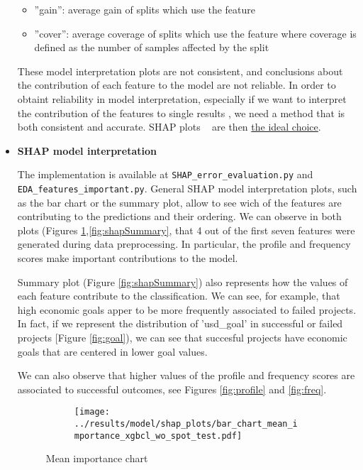 \documentclass{article}
\begin{document}
\begin{itemize}
\begin{itemize}
\item ”gain”: average gain of splits which use the feature

\item ”cover”: average coverage of splits which use the feature where coverage is defined as the number of samples affected by the split
\end{itemize}

These model interpretation plots are not consistent, and conclusions about the contribution of each feature to the model are not reliable. In order to obtaint reliability in model interpretation, especially if we want to interpret the contribution of the features to single results , we need a method that is both consistent and accurate. SHAP plots ~\cite{DBLP:journals/corr/LundbergL17, lundberg2020local2global} are then \href{https://towardsdatascience.com/interpretable-machine-learning-with-xgboost-9ec80d148d27}{the ideal choice}.

\item \textbf{SHAP model interpretation}

The implementation is available at {\tt SHAP\_error\_evaluation.py} and {\tt EDA\_features\_important.py}.
General SHAP model interpretation plots, such as the bar chart or the summary plot, allow to see wich of the features are contributing to the predictions and their ordering. We can observe in both plots (Figures \ref{fig:shapBar},\ref{fig:shapSummary}, that 4 out of the first seven features were generated during data preprocessing. In particular, the profile and frequency scores make important contributions to the model.

Summary plot (Figure \ref{fig:shapSummary}) also represents how the values of each feature contribute to the classification. We can see, for example, that high economic goals apper to be more frequently associated to failed projects. In fact, if we represent the distribution of 'usd\_goal' in successful or failed projects [Figure \ref{fig:goal}), we can see that succesful projects have economic goals that are centered in lower goal values.

We can also observe that higher values of the profile and frequency scores are associated to successful outcomes, see Figures \ref{fig:profile} and \ref{fig:freq}.

\begin{figure}
  \begin{subfigure}{1\linewidth}
    \centering\texttt{[image: ../results/model/shap\_plots/bar\_chart\_mean\_importance\_xgbcl\_wo\_spot\_test.pdf]}
  \end{subfigure}
\caption{Mean importance chart}
\label{fig:shapBar}
\end{figure}


\end{itemize}
\end{document}
